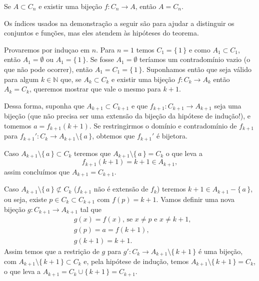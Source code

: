 \documentclass[../main.tex]{subfiles}
\begin{document}
\begin{teo}\label{enum-teo-bijecaoACn}
    Se $A \subset C_n$ e existir uma bijeção $f \colon C_n \to A$, então $A = C_n$.
\end{teo}
\begin{dem}
    Os índices usados na demonstração a seguir são para ajudar a distinguir os conjuntos e funções, mas eles atendem às hipóteses do teorema.
    
    Provaremos por induçao em $n$. Para $n = 1$ temos $C_1 = \{\,1\,\}$ e como $A_1 \subset C_1$, então $A_1 = \emptyset $ ou $ A_1 = \{\,1\,\}$. Se fosse $A_1 = \emptyset$ teríamos um contradomínio vazio (o que não pode ocorrer), então $A_1 = C_1 = \{\,1\,\}$. Suponhamos então que seja válido para algum $k \in \mathbb{N}$ que, se $A_k \subset C_k $ e existir uma bijeção $f \colon C_k \to A_k$ então $A_k = C_k$, queremos mostrar que vale o mesmo para $k+1$.

    Dessa forma, suponha que $A_{k+1} \subset C_{k+1}$ e que $f_{k+1} \colon C_{k+1} \to A_{k+1}$ seja uma bijeção (que não precisa ser uma extensão da bijeção da hipótese de indução!), e tomemos $a = f_{k+1}(k+1)$. Se restringirmos o domínio e contradomínio de $f_{k+1}$ para 
    $f_{k+1}' \colon C_k \to A_{k+1} \setminus \{\,a\,\}$, obtemos que $f_{k+1}'$ é bijetora.

    Caso $A_{k+1} \setminus \{\,a\,\} \subset C_k$ teremos que $A_{k+1} \setminus \{\,a\,\} = C_k$ o que leva a 
    \[ f_{k+1}(k+1) = k+1 \in A_{k+1},\] 
    assim concluímos que $A_{k+1} = C_{k+1}$. 
    
    Caso $A_{k+1} \setminus \{\,a\,\} \not\subset C_k$ ($f_{k+1}$ não é extensão de $f_k$)
    teremos $k+1 \in A_{k+1} - \{\,a\,\}$, ou seja, existe $p \in C_{k} \subset C_{k+1}$ com $f(p) = k+1$. Vamos definir uma nova bijeção 
    $g \colon C_{k+1} \to A_{k+1} $ tal que
    \begin{align*}
        &g(x) = f(x) \text{, se } x \neq p \text{ e } x \neq k+1, \\
        &g(p) = a = f(k+1), \\
        &g(k+1) = k+1.
    \end{align*}
    Assim temos que a restrição de $g$ para $g' \colon C_k \to A_{k+1} \setminus \{\,k+1\,\}$ é uma bijeção, com $A_{k+1} \setminus \{\,k+1\,\} \subset C_k$ e, pela hipótese de indução, temos $A_{k+1} \setminus \{\,k+1\,\} = C_k$, o que leva a $A_{k+1} = C_k \cup \{\,k+1\,\} = C_{k+1}$. 
    
\end{dem}
\end{document}
